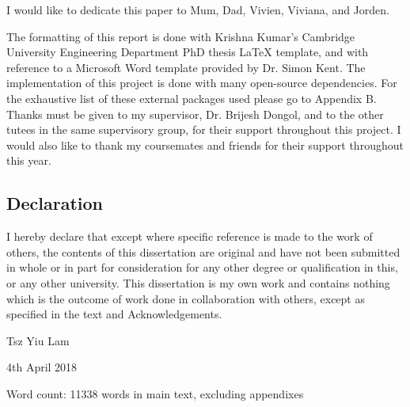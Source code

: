 
\begin{acknowledgements}      

\begin{center}
I would like to dedicate this paper to Mum, Dad, Vivien, Viviana, and Jorden.\\
\end{center}

The formatting of this report is done with Krishna Kumar's Cambridge University Engineering Department PhD thesis 
LaTeX template, and with reference to a Microsoft Word template provided by Dr. Simon Kent. 
The implementation of this project is done with many open-source dependencies.
For the exhaustive list of these external packages used please go to Appendix B.\\

Thanks must be given to my supervisor, Dr. Brijesh Dongol, and to the other tutees in the same supervisory group, 
for their support throughout this project. I would also like to thank my coursemates and friends for their 
support throughout this year.\\

\begin{center}
\section*{Declaration}
\end{center}
\vspace{1cm}
I hereby declare that except where specific reference is made to the work of 
others, the contents of this dissertation are original and have not been 
submitted in whole or in part for consideration for any other degree or 
qualification in this, or any other university. This dissertation is my own 
work and contains nothing which is the outcome of work done in collaboration 
with others, except as specified in the text and Acknowledgements.

\begin{flushright}
Tsz Yiu Lam

4th April 2018
\end{flushright}
\vspace{1cm}
\begin{center}
Word count: 11338 words in main text, excluding appendixes
\end{center}
\end{acknowledgements}
